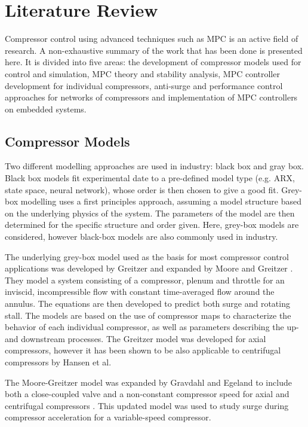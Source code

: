 \chapter{Literature Review}
\label{sec:lit}

Compressor control using advanced techniques such as MPC is an active field of research. 
A non-exhaustive summary of the work that has been done is presented here.
It is divided into five areas: the development of compressor models used for control and simulation, MPC theory and stability analysis, MPC controller development for individual compressors, anti-surge and performance control approaches for networks of compressors and implementation of MPC controllers on embedded systems. 

\section{Compressor Models}

Two different modelling approaches are used in industry: black box and gray box. Black box models fit experimental date to a pre-defined model type (e.g. ARX, state space, neural network), whose order is then chosen to give a good fit. 
Grey-box modelling uses a first principles approach, assuming a model structure based on the underlying physics of the system. 
The parameters of the model are then determined for the specific structure and order given. 
Here, grey-box models are considered, however black-box models are also commonly used in industry.

The underlying grey-box model used as the basis for most compressor control applications was developed by Greitzer \cite{Greitzer1976} and expanded by Moore and Greitzer \cite{Moore1985}.
They model a system consisting of a compressor, plenum and throttle for an inviscid, incompressible flow with constant time-averaged flow around the annulus. 
The equations are then developed to predict both surge and rotating stall.
The models are based on the use of compressor maps to characterize the behavior of each individual compressor, as well as parameters describing the up- and downstream processes.
The Greitzer model was developed for axial compressors, however it has been shown to be also applicable to centrifugal compressors by Hansen et al. \cite{Hansen1981} 

The Moore-Greitzer model was expanded by Gravdahl and Egeland to include both a close-coupled valve and a non-constant compressor speed for axial and centrifugal compressors \cite{Gravdahl1999}. 
This updated model was used to study surge during compressor acceleration for a variable-speed compressor.

